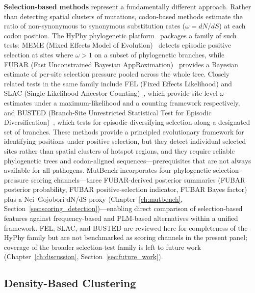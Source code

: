 \textbf{Selection-based methods} represent a fundamentally different approach.
Rather than detecting spatial clusters of mutations, codon-based methods estimate the ratio of non-synonymous to synonymous substitution rates ($\omega = dN/dS$) at each codon position.
The HyPhy phylogenetic platform~\cite{kosakovsky2020hyphy} packages a family of such tests: MEME (Mixed Effects Model of Evolution)~\cite{murrell2012meme} detects episodic positive selection at sites where $\omega > 1$ on a subset of phylogenetic branches, while FUBAR (Fast Unconstrained Bayesian AppRoximation)~\cite{murrell2013fubar} provides a Bayesian estimate of per-site selection pressure pooled across the whole tree.
Closely related tests in the same family include FEL (Fixed Effects Likelihood) and SLAC (Single Likelihood Ancestor Counting)~\cite{kosakovskypond2005fel}, which provide site-level $\omega$ estimates under a maximum-likelihood and a counting framework respectively, and BUSTED (Branch-Site Unrestricted Statistical Test for Episodic Diversification)~\cite{murrell2015busted}, which tests for episodic diversifying selection along a designated set of branches.
These methods provide a principled evolutionary framework for identifying positions under positive selection, but they detect individual selected sites rather than spatial clusters of hotspot regions, and they require reliable phylogenetic trees and codon-aligned sequences---prerequisites that are not always available for all pathogens.
MutBench incorporates four phylogenetic selection-pressure scoring channels---three FUBAR-derived posterior summaries (FUBAR posterior probability, FUBAR positive-selection indicator, FUBAR Bayes factor) plus a Nei--Gojobori dN/dS proxy (Chapter~\ref{ch:mutbench}, Section~\ref{sec:scoring_detection})---enabling direct comparison of selection-based features against frequency-based and PLM-based alternatives within a unified framework. FEL, SLAC, and BUSTED are reviewed here for completeness of the HyPhy family but are not benchmarked as scoring channels in the present panel; coverage of the broader selection-test family is left to future work (Chapter~\ref{ch:discussion}, Section~\ref{sec:future_work}).

\subsection{Density-Based Clustering}
\label{subsec:bg_density_clustering}

